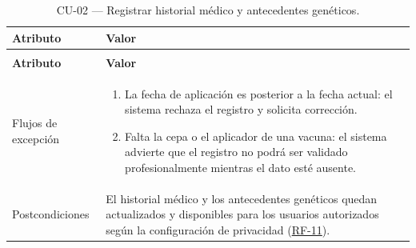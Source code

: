 \documentclass[journal,onecolumn]{IEEEtran}
\makeatletter
\newenvironment{atributos}[2]{%
	\small
	\begin{longtable}{@{}>{\raggedright\arraybackslash}p{4.2cm} >{\raggedright\arraybackslash}p{11.2cm}@{}}
		\caption{#2}\label{tab:#1}\\
		\toprule
		\textbf{Atributo} & \textbf{Valor} \\
		\midrule
		\endfirsthead
		\multicolumn{2}{@{}l}{\small\itshape (continuación)}\\
		\toprule
		\textbf{Atributo} & \textbf{Valor} \\
		\midrule
		\endhead
		\bottomrule
		\endlastfoot
	}{%
	\end{longtable}
	\normalsize
}
\makeatother
\begin{document}
\begin{atributos}{CU-02}{CU-02 --- Registrar historial médico y antecedentes genéticos.}
		Flujos de excepción &
		\begin{enumerate}[leftmargin=*, nosep]
			\item[6.1] La fecha de aplicación es posterior a la fecha actual: el sistema rechaza el registro y solicita corrección.
			\item[6.2] Falta la cepa o el aplicador de una vacuna: el sistema advierte que el registro no podrá ser validado profesionalmente mientras el dato esté ausente.
		\end{enumerate} \\
		Postcondiciones & El historial médico y los antecedentes genéticos quedan actualizados y disponibles para los usuarios autorizados según la configuración de privacidad (\hyperref[tab:RF-11]{RF-11}). \\
	\end{atributos}
	
\end{document}
